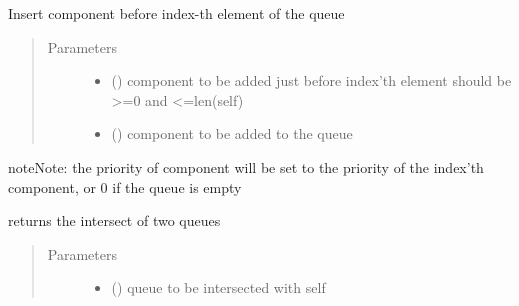 \documentclass[letterpaper,10pt,english]{sphinxmanual}
\begin{document}
\begin{fulllineitems}
\begin{fulllineitems}
\end{fulllineitems}


\begin{fulllineitems}
\label{\detokenize{Reference:salabim.Queue.insert}}
Insert component before index-th element of the queue
\begin{quote}\begin{description}
\item[{Parameters}] \leavevmode\begin{itemize}
\item {} 
 () \textendash{} component to be added just before index’th element 
should be \textgreater{}=0 and \textless{}=len(self)

\item {} 
 ({\hyperref[\detokenize{Reference:salabim.Component}]{}}) \textendash{} component to be added to the queue

\end{itemize}

\end{description}\end{quote}

\begin{sphinxadmonition}{note}{Note:}
the priority of component will be set to the priority of the index’th component,
or 0 if the queue is empty
\end{sphinxadmonition}

\end{fulllineitems}


\begin{fulllineitems}
\label{\detokenize{Reference:salabim.Queue.intersection}}
returns the intersect of two queues
\begin{quote}\begin{description}
\item[{Parameters}] \leavevmode\begin{itemize}
\item {} 
 ({\hyperref[\detokenize{Reference:salabim.Queue}]{}}) \textendash{} queue to be intersected with self


\end{itemize}
\end{description}
\end{quote}
\end{fulllineitems}
\end{fulllineitems}
\end{document}
